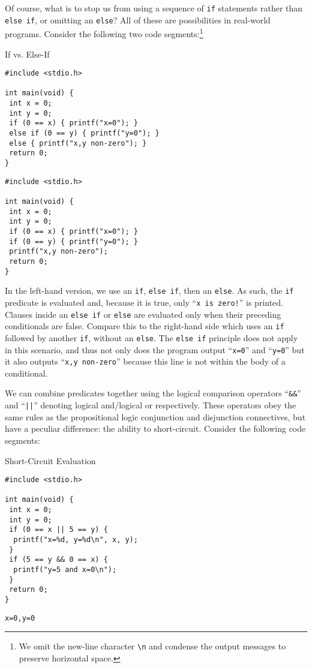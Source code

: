 Of course, what is to stop us from using a sequence of \texttt{if} statements rather than \texttt{else if}, or omitting an \texttt{else}? All of these are possibilities in real-world programs. Consider the following two code segments:\footnote{We omit the new-line character \texttt{\textbackslash{}n} and condense the output messages to preserve horizontal space.}

\begin{clrr}[main.c]{If vs. Else-If}
\begin{lstlisting}[language=MyC]
#include <stdio.h>

int main(void) {
 int x = 0;
 int y = 0;
 if (0 == x) { printf("x=0"); }
 else if (0 == y) { printf("y=0"); }
 else { printf("x,y non-zero"); }
 return 0;
}
\end{lstlisting}
\tcblower
\begin{lstlisting}[language=MyNLNC]
#include <stdio.h>

int main(void) {
 int x = 0;
 int y = 0;
 if (0 == x) { printf("x=0"); }
 if (0 == y) { printf("y=0"); }
 printf("x,y non-zero");
 return 0;
}
\end{lstlisting}
\end{clrr}

In the left-hand version, we use an \texttt{if}, \texttt{else if}, then an \texttt{else}. As such, the \texttt{if} predicate is evaluated and, because it is true, only ``\texttt{x is zero!}'' is printed. Clauses inside an \texttt{else if} or \texttt{else} are evaluated only when their preceding conditionals are false. Compare this to the right-hand side which uses an \texttt{if} followed by another \texttt{if}, without an \texttt{else}. The \texttt{else if} principle does not apply in this scenario, and thus not only does the program output ``\texttt{x=0}'' and ``\texttt{y=0}'' but it also outputs ``\texttt{x,y non-zero}'' because this line is not within the body of a conditional.

We can combine predicates together using the logical comparison operators ``\texttt{\&\&}'' and ``\texttt{||}'' denoting logical and/logical or respectively. These operators obey the same rules as the propositional logic conjunction and disjunction connectives, but have a peculiar difference: the ability to short-circuit. 
Consider the following code segments:

\begin{cloast}[main.c]{Short-Circuit Evaluation}
\begin{lstlisting}[language=MyC]
#include <stdio.h>

int main(void) {
 int x = 0;
 int y = 0;
 if (0 == x || 5 == y) {
  printf("x=%d, y=%d\n", x, y); 
 }
 if (5 == y && 0 == x) {
  printf("y=5 and x=0\n");
 }
 return 0;
}
\end{lstlisting}
\tcblower
\begin{lstlisting}[language=MyOutput]
x=0,y=0
\end{lstlisting}
\end{cloast}

